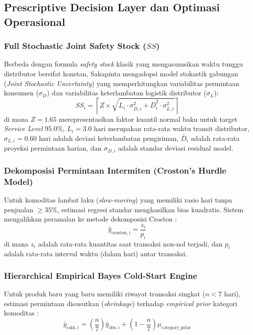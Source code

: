 \documentclass[12pt,a4paper]{article}
\begin{document}
\subsection{Prescriptive Decision Layer dan Optimasi Operasional}

\subsubsection{Full Stochastic Joint Safety Stock (\texorpdfstring{$SS$}{SS})}
Berbeda dengan formula \textit{safety stock} klasik yang mengasumsikan waktu tunggu distributor bersifat konstan, Sakapinta mengadopsi model stokastik gabungan (\textit{Joint Stochastic Uncertainty}) \citep{chopra2019supply, silver2016inventory} yang memperhitungkan variabilitas permintaan konsumen ($\sigma_D$) dan variabilitas keterlambatan logistik distributor ($\sigma_L$):
\begin{equation}
    SS_i = \left\lceil Z \times \sqrt{L_i \cdot \sigma_{D, i}^2 + \bar{D}_i^2 \cdot \sigma_{L, i}^2} \right\rceil
\end{equation}
di mana $Z = 1.65$ merepresentasikan faktor kuantil normal baku untuk target \textit{Service Level} 95.0\%, $L_i = 3.0\text{ hari}$ merupakan rata-rata waktu transit distributor, $\sigma_{L, i} = 0.60\text{ hari}$ adalah deviasi keterlambatan pengiriman, $\bar{D}_i$ adalah rata-rata proyeksi permintaan harian, dan $\sigma_{D, i}$ adalah standar deviasi residual model.

\subsubsection{Dekomposisi Permintaan Intermiten (Croston's Hurdle Model)}
Untuk komoditas lambat laku (\textit{slow-moving}) yang memiliki rasio hari tanpa penjualan $\ge 35\%$, estimasi regresi standar menghasilkan bias kuadratis. Sistem mengalihkan peramalan ke metode dekomposisi Croston \citep{croston1972forecasting, syntetos2005accuracy}:
\begin{equation}
    \hat{y}_{\text{croston}, i} = \frac{z_i}{p_i}
\end{equation}
di mana $z_i$ adalah rata-rata kuantitas saat transaksi non-nol terjadi, dan $p_i$ adalah rata-rata interval waktu (dalam hari) antar transaksi.

\subsubsection{Hierarchical Empirical Bayes Cold-Start Engine}
Untuk produk baru yang baru memiliki riwayat transaksi singkat ($n < 7\text{ hari}$), estimasi permintaan disusutkan (\textit{shrinkage}) terhadap \textit{empirical prior} kategori komoditas \citep{gelman2013bayesian}:
\begin{equation}
    \bar{y}_{\text{cold}, i} = \left(\frac{n}{7}\right) \bar{y}_{\text{obs}, i} + \left(1 - \frac{n}{7}\right) \mu_{\text{category\_prior}}
\end{equation}
\end{document}
